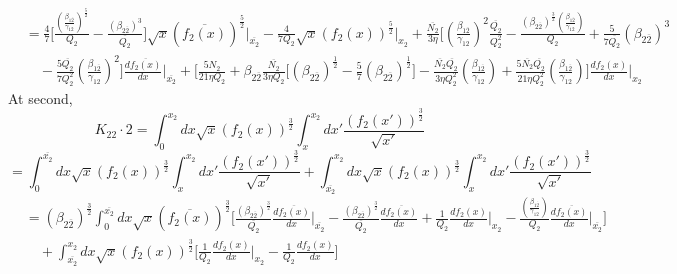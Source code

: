\documentclass[fleqn, 10pt]{article}
\begin{document}
            \begin{equation}
            \begin{split}
            &= \frac{4}{7} \biggl[\frac{\left(\frac{\beta_{1\overline{2}}}{\gamma_{12}}\right)^\frac{5}{2}}{Q_{2}} - \frac{\left(\beta_{2\overline{2}}\right)^{3}}{\overline{Q_{2}}}\biggr] \sqrt{x}  (\overline{f_{2}(x)})^\frac{5}{2} \Bigg|_{\overline{x_{2}}} -   \frac{4}{7 Q_{2}} \sqrt{x} (f_{2}(x))^\frac{5}{2} \Bigg|_{x_{2}}+ \frac{\overline{N_{2}}}{3 \eta} \biggl[ \left(\frac{\beta_{1\overline{2}}}{\gamma_{12}}\right)^{2} \frac{\overline{Q_{2}}}{Q_{2}^{2}} - \frac{(\beta_{2\overline{2}})^\frac{3}{2} \left(\frac{\beta_{1\overline{2}}}{\gamma_{12}}\right)}{Q_{2}} + \frac{5}{7 \overline{Q_{2}}} (\beta_{2\overline{2}})^{3} \\ & \quad - \frac{5 \overline{Q_{2}}}{7 Q_{2}^{2}} \left(\frac{\beta_{1\overline{2}}}{\gamma_{12}}\right)^{2}   \biggr] \frac{d\overline{f_{2}(x)}}{dx} \Bigg|_{\overline{x_{2}}} + \biggl[ \frac{5 N_{2}}{21 \eta Q_{2}} + \beta_{2\overline{2}} \frac{\overline{N_{2}}}{3 \eta Q_{2}} \biggl[ (\beta_{2\overline{2}})^\frac{1}{2} - \frac{5}{7} (\beta_{2\overline{2}})^\frac{1}{2} \biggr] - \frac{\overline{N_{2}} \overline{Q_{2}}}{3 \eta Q_{2}^{2}} \left(\frac{\beta_{1\overline{2}}}{\gamma_{12}}\right) + \frac{5 \overline{N_{2}} \overline{Q_{2}}}{21 \eta Q_{2}^{2}} \left(\frac{\beta_{1\overline{2}}}{\gamma_{12}}\right)   \biggr] \frac{df_{2}(x)}{dx} \Bigg|_{x_{2}}
            \label{51}
            \end{split}
            \end{equation}
            At second, 
            \begin{equation}
            K_{22} \cdot 2 = \int^{x_2}_0 dx\sqrt{x} (f_2(x))^\frac{3}{2} \int^{x_2}_{x} dx'\frac{(f_2(x'))^\frac{3}{2}}{\sqrt{x'}}
            \label{52}
            \end{equation}
            \begin{equation*}
            = \int^{\overline{x_2}}_0 dx \sqrt{x} (f_2(x))^\frac{3}{2} \int^{x_2}_x dx' \frac{(f_2(x'))^\frac{3}{2}}{\sqrt{x'}} + \int^{x_2}_{\overline{x_2}} dx \sqrt{x} (f_2(x))^\frac{3}{2} \int^{x_2}_x dx' \frac{(f_2(x'))^\frac{3}{2}}{\sqrt{x'}}
            \end{equation*}
            \begin{equation*}
            \begin{split}
            &        =     (\beta_{2\overline{2}})^\frac{3}{2} \int^{\overline{x_2}}_0 dx \sqrt{x} (\overline{f_2(x)})^\frac{3}{2} \Biggl[\frac{(\beta_{2\overline{2}})^\frac{3}{2}}{\overline{Q_2}} \frac{d\overline{f_2(x)}}{dx} \Bigg|_{\overline{x_2}} -  \frac{(\beta_{2\overline{2}})^\frac{3}{2}}{\overline{Q_2}}\frac{d\overline{f_2(x)}}{dx} + \frac{1}{Q_2} \frac{df_2(x)}{dx} \Bigg|_{x_2} - \frac{\left(\frac{\beta_{1\overline{2}}}{\gamma_{12}}\right)}{Q_2} \frac{d\overline{f_2(x)}}{dx} \Bigg|_{\overline{x_2}} \Biggr] \\ & \quad +    \int^{x_2}_{\overline{x_2}} dx \sqrt{x} (f_2(x))^\frac{3}{2} \biggl[\frac{1}{Q_2} \frac{df_2(x)}{dx}\Bigg|_{x_2} - \frac{1}{Q_2} \frac{df_2(x)}{dx}\biggr]
            \end{split}
            \end{equation*}
\end{document}
